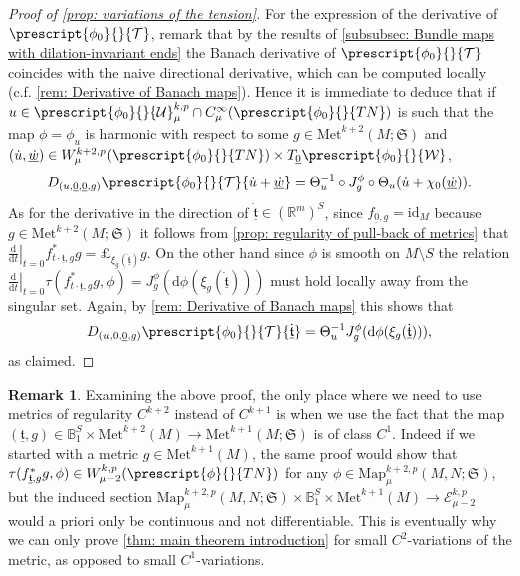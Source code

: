 \documentclass{article}
\numberwithin{equation}{section}        %
\theoremstyle{bfnote}
\theoremstyle{definition}
\theoremstyle{bfremark}
\newtheorem{rem}[thm]{Remark}               %
\newcommand{\R}{\mathbb{R}}                 %
\newcommand{\Ball}{\mathbb{B}}              %
\newcommand{\Map}{\mathrm{Map}}             %
\newcommand{\Met}{\mathrm{Met}}             %
\newcommand{\diff}{\mathrm{d}}                      %
\begin{document}
\begin{proof}[Proof of \cref{prop: variations of the tension}]
    For the expression of the derivative of $\prescript{\phi_0}{}{\mathcal{T}}$, remark that by the results of \cref{subsubsec: Bundle maps with dilation-invariant ends} the Banach derivative of $\prescript{\phi_0}{}{\mathcal{T}}$ coincides with the naive directional derivative, which can be computed locally (c.f. \cref{rem: Derivative of Banach maps}). Hence it is immediate to deduce that if $u \in \prescript{\phi_0}{}{\mathcal{U}}^{k,p}_\mu \cap C^\infty_\mu(\prescript{\phi_0}{}{TN})$ is such that the map $\phi = \phi_{u}$ is harmonic with respect to some $g \in \Met^{k+2}(M;\mathfrak{S})$ and $(\dot u, \underline{\dot w}) \in W^{k+2,p}_\mu(\prescript{\phi_0}{}{TN}) \times T_{\underline{0}} \prescript{\phi_0}{}{\mathcal{W}}$, 
    \begin{equation*}
        D_{(u,\underline{0},\underline{0},g)} \prescript{\phi_0}{}{\mathcal{T}}\{ \dot u + \underline{\dot w}\} = \Theta_{u}^{-1} \circ J^{\phi}_g \circ \Theta_{u}(\dot u + \chi_0(\underline{\dot w})) .
    \end{equation*}
    As for the derivative in the direction of $\dot{\underline{\mathfrak{t}}} \in (\R^m)^S$, since $f_{\underline{0},g} = \mathrm{id}_M$ because $g \in \Met^{k+2}(M;\mathfrak{S})$ it follows from \cref{prop: regularity of pull-back of metrics} that $\left. \frac{\diff}{\diff t} \right|_{t = 0} f_{t \cdot \underline{\mathfrak{t}},g}^* g = \pounds_{\xi_g(\dot{\underline{\mathfrak{t}}})}g$. On the other hand since $\phi$ is smooth on $M \setminus S$ the relation $\left. \frac{\diff}{\diff t} \right|_{t = 0}\tau(f_{t \cdot \underline{\mathfrak{t}},g}^* g,\phi) = J^{\phi}_g(\diff \phi(\xi_g(\dot{\underline{\mathfrak{t}}})))$ must hold locally away from the singular set. Again, by \cref{rem: Derivative of Banach maps} this shows that
    \begin{equation*}
        D_{(u,0,\underline{0},g)} \prescript{\phi_0}{}{\mathcal{T}}\{ \dot{\underline{\mathfrak{t}}}\} = \Theta_{u}^{-1} J^{\phi}_g(\diff \phi(\xi_g(\dot{\underline{\mathfrak{t}}}))),
    \end{equation*}
    as claimed.
\end{proof}

\begin{rem}     \label{rem: derivatives of the metric}
    Examining the above proof, the only place where we need to use metrics of regularity $C^{k+2}$ instead of $C^{k+1}$ is when we use the fact that the map $(\underline{\mathfrak{t}},g) \in \Ball_1^S \times \Met^{k+2}(M) \to \Met^{k+1}(M;\mathfrak{S})$ is of class $C^1$. Indeed if we started with a metric $g \in \Met^{k+1}(M)$, the same proof would show that $\tau(f_{\underline{\mathfrak{t}},g}^*g,\phi) \in W^{k,p}_{\mu-2}(\prescript{\phi}{}{TN})$ for any $\phi \in \Map^{k+2,p}_\mu(M,N;\mathfrak{S})$, but the induced section $\Map^{k+2,p}_\mu(M,N;\mathfrak{S}) \times \Ball^S_1 \times \Met^{k+1}(M) \to \mathcal{E}^{k,p}_{\mu-2}$ would a priori only be continuous and not differentiable. This is eventually why we can only prove \cref{thm: main theorem introduction} for small $C^2$-variations of the metric, as opposed to small $C^1$-variations.
\end{rem}
\end{document}

